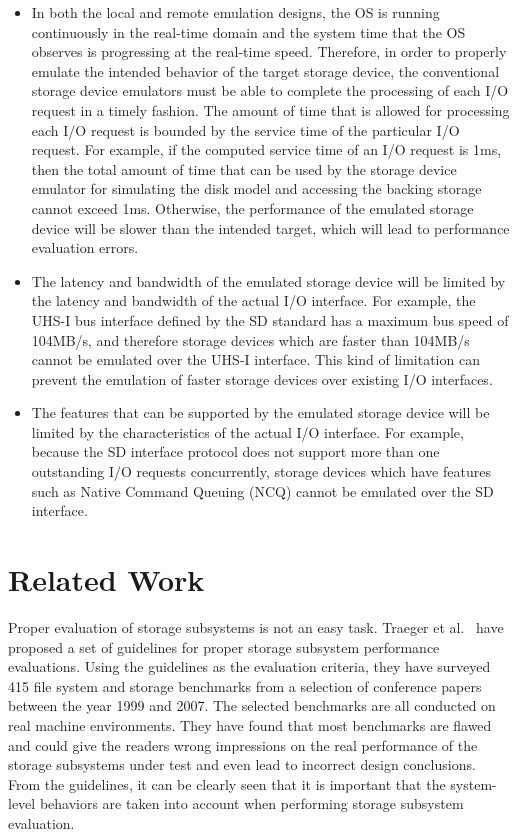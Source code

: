 \begin{itemize}
	\item In both the local and remote emulation designs, the OS is running continuously in the real-time domain and the system time that the OS observes is progressing at the real-time speed. Therefore, in order to properly emulate the intended behavior of the target storage device, the conventional storage device emulators must be able to complete the processing of each I/O request in a timely fashion. The amount of time that is allowed for processing each I/O request is bounded by the service time of the particular I/O request. For example, if the computed service time of an I/O request is 1ms, then the total amount of time that can be used by the storage device emulator for simulating the disk model and accessing the backing storage cannot exceed 1ms. Otherwise, the performance of the emulated storage device will be slower than the intended target, which will lead to performance evaluation errors.
	
	\item The latency and bandwidth of the emulated storage device will be limited by the latency and bandwidth of the actual I/O interface. For example, the UHS-I bus interface defined by the SD standard has a maximum bus speed of 104MB/s, and therefore storage devices which are faster than 104MB/s cannot be emulated over the UHS-I interface. This kind of limitation can prevent the emulation of faster storage devices over existing I/O interfaces.
	
	\item The features that can be supported by the emulated storage device will be limited by the characteristics of the actual I/O interface. For example, because the SD interface protocol does not support more than one outstanding I/O requests concurrently, storage devices which have features such as Native Command Queuing (NCQ) cannot be emulated over the SD interface.
\end{itemize}

\section {Related Work}
\label{ch2:summary}

Proper evaluation of storage subsystems is not an easy task. Traeger et al.~\cite{Traeger:2008} have proposed a set of guidelines for proper storage subsystem performance evaluations.
Using the guidelines as the evaluation criteria, they have surveyed 415 file system and storage benchmarks from a selection of conference papers between the year 1999 and 2007. The selected benchmarks are all conducted on real machine environments. They have found that most benchmarks are flawed and could give the readers wrong impressions on the real performance of the storage subsystems under test and even lead to incorrect design conclusions. From the guidelines, it can be clearly seen that it is important that the system-level behaviors are taken into account when performing storage subsystem evaluation.

